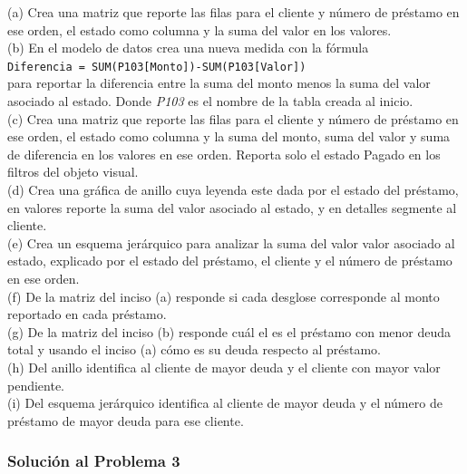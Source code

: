 \documentclass{article}
\begin{document}
\break
\noindent
(a) Crea una matriz que reporte las filas para el cliente y número de préstamo en ese orden, el estado como columna y la suma del valor en los valores.
\\[6pt]
(b) En el modelo de datos crea una nueva medida con la fórmula
\\[6pt]
\texttt{Diferencia = SUM(P103[Monto])-SUM(P103[Valor])} 
\\[6pt]
para reportar la diferencia entre la suma del monto menos la suma del valor asociado al estado. Donde \textit{P103} es el nombre de la tabla creada al inicio.
\\[6pt]
(c) Crea una matriz que reporte las filas para el cliente y número de préstamo en ese orden, el estado como columna y la suma del monto, suma del valor y suma de diferencia en los valores en ese orden. Reporta solo el estado Pagado en los filtros del objeto visual.
\\[6pt]
(d) Crea una gráfica de anillo cuya leyenda este dada por el estado del préstamo, en valores reporte la suma del valor asociado al estado, y en detalles segmente al cliente.
\\[6pt]
(e) Crea un esquema jerárquico para analizar la suma del valor valor asociado al estado, explicado por el estado del préstamo, el cliente y el número de préstamo en ese orden.
\\[6pt]
(f) De la matriz del inciso (a) responde si cada desglose corresponde al monto reportado en cada préstamo.
\\[6pt]
(g) De la matriz del inciso (b) responde cuál el es el préstamo con menor deuda total y usando el inciso (a) cómo es su deuda respecto al préstamo.
\\[6pt]
(h) Del anillo identifica al cliente de mayor deuda y el cliente con mayor valor pendiente.
\\[6pt]
(i) Del esquema jerárquico identifica al cliente de mayor deuda y el número de préstamo de mayor deuda para ese cliente.

\clearpage

\subsubsection*{Solución al Problema 3}
\end{document}

